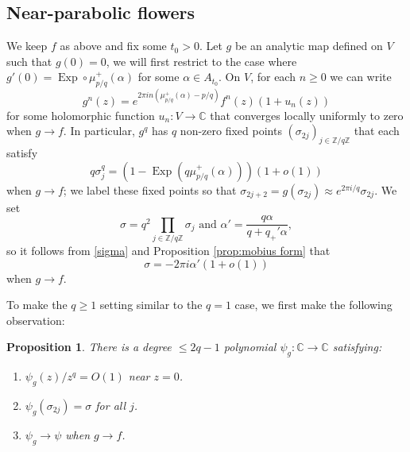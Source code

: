 \documentclass[12pt,letterpaper]{amsart}
\numberwithin{equation}{section}
\newtheorem{prop}[equation]{Proposition}
\theoremstyle{remark}
\theoremstyle{definition}
\newcommand{\C}{\mathbb C}
\newcommand{\Z}{\mathbb Z}
\DeclareMathOperator{\Exp}{Exp}
\begin{document}
	
	\subsection{Near-parabolic flowers}
	
	We keep  $f$ as above and fix some $t_0>0$. Let  $g$ be an analytic map defined on $V$ such that $g(0) = 0$, we will first restrict to the case where $g'(0)=\Exp\circ \mu_{p/q}^+ (\alpha)$ for some $\alpha\in A_{t_0}$. 
	On $V$, for each $n\geq 0$  we can write 
	$$g^n(z) = e^{2\pi i n(\mu_{p/q}^+(\alpha)-p/q)}f^n(z)(1+u_n(z))$$
	for some holomorphic function $u_n: V\to \C$ that converges locally uniformly to zero when $g\to f$. 
%	
	In particular, $g^q$ has $q$ non-zero fixed points $(\sigma_{2j})_{j\in \Z/q\Z}$ that each satisfy
	\begin{equation}\label{sigma}
		q\sigma_j^q = (1-\Exp(q \mu_{p/q}^+(\alpha)))(1+o(1))
	\end{equation}
	when $g\to f$; we label these fixed points so that $\sigma_{2j+2}= g(\sigma_{2j})\approx e^{2\pi i /q}\sigma_{2j}.$
	We set 
	$$\sigma= q^2\prod_{j\in \Z/q\Z}\sigma_j \text{ and }\alpha' = \frac{q\alpha}{q+q_+'\alpha},$$
	so it follows from \eqref{sigma} and Proposition \ref{prop:mobius form} that
	$$\sigma= -2\pi i\alpha'(1+o(1))$$
	when $g\to f$.
	
	To make the $q\geq 1$ setting similar to the $q=1$ case, we first make the following observation:
	\begin{prop}
		There is a degree $\leq 2q-1$ polynomial $\psi_g:\C\to \C$ satisfying:
		\begin{enumerate}
			\item $\psi_g(z)/z^q = O(1)$ near $z=0$.
			\item $\psi_g(\sigma_{2j})=\sigma$ for all $j$. 
			\item $\psi_g\to \psi$ when $g\to f$.
		\end{enumerate}
	\end{prop}
	
\end{document}
